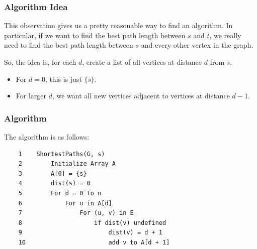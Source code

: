 \documentclass[letterpaper]{article}
\begin{document}
\subsubsection{Algorithm Idea}
This observation gives us a pretty reasonable way to find an algorithm. In particular, if we want to find the best path length between $s$ and $t$, we really need to find the best path length between $s$ and every other vertex in the graph.

\bigskip 

So, the idea is, for each $d$, create a list of all vertices at distance $d$ from $s$.
\begin{itemize}
    \item For $d = 0$, this is just $\{s\}$.
    \item For larger $d$, we want all new vertices adjacent to vertices at distance $d - 1$.
\end{itemize}

\subsubsection{Algorithm}
The algorithm is as follows:
\begin{verbatim}
    1    ShortestPaths(G, s)
    2        Initialize Array A
    3        A[0] = {s}
    4        dist(s) = 0
    5        For d = 0 to n
    6            For u in A[d]
    7                For (u, v) in E
    8                    if dist(v) undefined
    9                        dist(v) = d + 1
    10                       add v to A[d + 1]
\end{verbatim}
\end{document}
